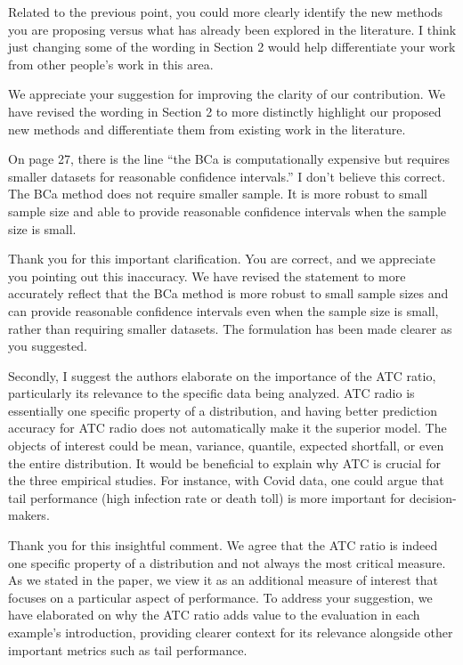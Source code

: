 \documentclass[12pt]{journalrebuttal}
\begin{document}
\begin{revcomment}
    Related to the previous point, you could more clearly identify the new methods you are proposing versus what has already been explored in the literature. I think just changing some of the wording in Section 2 would help differentiate your work from other people's work in this area.
\end{revcomment}
\begin{response}
    We appreciate your suggestion for improving the clarity of our contribution. We have revised the wording in Section 2 to more distinctly highlight our proposed new methods and differentiate them from existing work in the literature.
\end{response}

\begin{revcomment}
On page 27, there is the line \enquote{the BCa is computationally expensive but requires smaller datasets for reasonable confidence intervals.} I don't believe this correct. The BCa method does not require smaller sample. It is more robust to small sample size and able to provide reasonable confidence intervals when the sample size is small.
\end{revcomment}
\begin{response}
    Thank you for this important clarification. You are correct, and we appreciate you pointing out this inaccuracy. We have revised the statement to more accurately reflect that the BCa method is more robust to small sample sizes and can provide reasonable confidence intervals even when the sample size is small, rather than requiring smaller datasets. The formulation has been made clearer as you suggested.
\end{response}


\nextreviewer

\begin{revcomment}
    Secondly, I suggest the authors elaborate on the importance of the ATC ratio, particularly its relevance to the specific data being analyzed. ATC radio is essentially one specific property of a distribution, and having better prediction accuracy for ATC radio does not automatically make it the superior model. The objects of interest could be mean, variance, quantile, expected shortfall, or even the entire distribution. It would be beneficial to explain why ATC is crucial for the three empirical studies. For instance, with Covid data, one could argue that tail performance (high infection rate or death toll) is more important for decision-makers.
\end{revcomment}
\begin{response}
    Thank you for this insightful comment. We agree that the ATC ratio is indeed one specific property of a distribution and not always the most critical measure. As we stated in the paper, we view it as an additional measure of interest that focuses on a particular aspect of performance. To address your suggestion, we have elaborated on why the ATC ratio adds value to the evaluation in each example's introduction, providing clearer context for its relevance alongside other important metrics such as tail performance.
\end{response}
\end{document}
